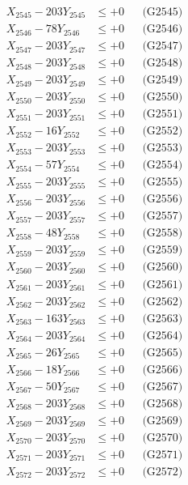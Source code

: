 \documentclass[a4paper,10pt]{article}
\begin{document}
{\begin{align}
X_{2545} - 203Y_{2545} &\leq +0 && \text{(G2545)} \\
X_{2546} - 78Y_{2546} &\leq +0 && \text{(G2546)} \\
X_{2547} - 203Y_{2547} &\leq +0 && \text{(G2547)} \\
X_{2548} - 203Y_{2548} &\leq +0 && \text{(G2548)} \\
X_{2549} - 203Y_{2549} &\leq +0 && \text{(G2549)} \\
X_{2550} - 203Y_{2550} &\leq +0 && \text{(G2550)} \\
\allowbreak
X_{2551} - 203Y_{2551} &\leq +0 && \text{(G2551)} \\
X_{2552} - 16Y_{2552} &\leq +0 && \text{(G2552)} \\
X_{2553} - 203Y_{2553} &\leq +0 && \text{(G2553)} \\
X_{2554} - 57Y_{2554} &\leq +0 && \text{(G2554)} \\
X_{2555} - 203Y_{2555} &\leq +0 && \text{(G2555)} \\
X_{2556} - 203Y_{2556} &\leq +0 && \text{(G2556)} \\
X_{2557} - 203Y_{2557} &\leq +0 && \text{(G2557)} \\
X_{2558} - 48Y_{2558} &\leq +0 && \text{(G2558)} \\
X_{2559} - 203Y_{2559} &\leq +0 && \text{(G2559)} \\
X_{2560} - 203Y_{2560} &\leq +0 && \text{(G2560)} \\
\allowbreak
X_{2561} - 203Y_{2561} &\leq +0 && \text{(G2561)} \\
X_{2562} - 203Y_{2562} &\leq +0 && \text{(G2562)} \\
X_{2563} - 163Y_{2563} &\leq +0 && \text{(G2563)} \\
X_{2564} - 203Y_{2564} &\leq +0 && \text{(G2564)} \\
X_{2565} - 26Y_{2565} &\leq +0 && \text{(G2565)} \\
X_{2566} - 18Y_{2566} &\leq +0 && \text{(G2566)} \\
X_{2567} - 50Y_{2567} &\leq +0 && \text{(G2567)} \\
X_{2568} - 203Y_{2568} &\leq +0 && \text{(G2568)} \\
X_{2569} - 203Y_{2569} &\leq +0 && \text{(G2569)} \\
X_{2570} - 203Y_{2570} &\leq +0 && \text{(G2570)} \\
\allowbreak
X_{2571} - 203Y_{2571} &\leq +0 && \text{(G2571)} \\
X_{2572} - 203Y_{2572} &\leq +0 && \text{(G2572)} \\

\end{align}}
\end{document}
